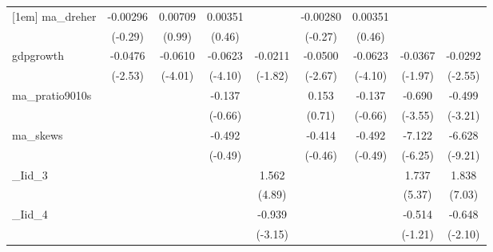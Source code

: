{\begin{tabular}{l*{8}{c}}
[1em]
ma\_dreher   &    -0.00296         &     0.00709         &     0.00351         &                     &    -0.00280         &     0.00351         &                     &                     \\
            &     (-0.29)         &      (0.99)         &      (0.46)         &                     &     (-0.27)         &      (0.46)         &                     &                     \\
[1em]
gdpgrowth   &     -0.0476\sym{*}  &     -0.0610\sym{***}&     -0.0623\sym{***}&     -0.0211         &     -0.0500\sym{**} &     -0.0623\sym{***}&     -0.0367\sym{*}  &     -0.0292\sym{*}  \\
            &     (-2.53)         &     (-4.01)         &     (-4.10)         &     (-1.82)         &     (-2.67)         &     (-4.10)         &     (-1.97)         &     (-2.55)         \\
[1em]
ma\_pratio9010s&                     &                     &      -0.137         &                     &       0.153         &      -0.137         &      -0.690\sym{***}&      -0.499\sym{**} \\
            &                     &                     &     (-0.66)         &                     &      (0.71)         &     (-0.66)         &     (-3.55)         &     (-3.21)         \\
[1em]
ma\_skews    &                     &                     &      -0.492         &                     &      -0.414         &      -0.492         &      -7.122\sym{***}&      -6.628\sym{***}\\
            &                     &                     &     (-0.49)         &                     &     (-0.46)         &     (-0.49)         &     (-6.25)         &     (-9.21)         \\
[1em]
\_Iid\_3      &                     &                     &                     &       1.562\sym{***}&                     &                     &       1.737\sym{***}&       1.838\sym{***}\\
            &                     &                     &                     &      (4.89)         &                     &                     &      (5.37)         &      (7.03)         \\
[1em]
\_Iid\_4      &                     &                     &                     &      -0.939\sym{**} &                     &                     &      -0.514         &      -0.648\sym{*}  \\
            &                     &                     &                     &     (-3.15)         &                     &                     &     (-1.21)         &     (-2.10)         \\

\end{tabular}}
